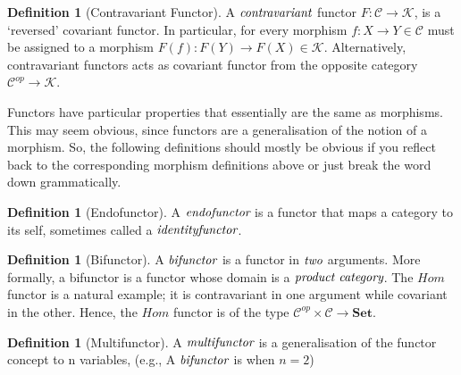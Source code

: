 \documentclass[10pt, oneside, reqno]{amsart}
\theoremstyle{plain}%
\theoremstyle{definition}
\newtheorem{defn}[thm]{Definition}
\theoremstyle{remark}
\begin{document}
\begin{defn}[Contravariant Functor]
 A $\emph{contravariant}$ functor $F: \mathcal{C} \to \mathcal{K}$, is a `reversed' covariant functor.
 In particular, for every morphism $f: X \to Y \in \mathcal{C}$ must be assigned to a morphism $F(f) : F(Y) \to F(X) \in \mathcal{K}$.
 Alternatively, contravariant functors acts as covariant functor from the opposite category $\mathcal{C}^{op} \to \mathcal{K}$.
\end{defn}

Functors have particular properties that essentially are the same as morphisms.
This may seem obvious, since functors are a generalisation of the notion of a morphism.
So, the following definitions should mostly be obvious if you reflect back to the corresponding morphism
definitions above or just break the word down grammatically.

\begin{defn}[Endofunctor]
 A $\emph{endofunctor}$ is a functor that maps a category to its self, sometimes called a $\emph{identityfunctor}$.
\end{defn}

\begin{defn}[Bifunctor]
 A $\emph{bifunctor}$ is a functor in $\emph{two}$ arguments. More formally, a bifunctor is a functor whose
 domain is a $\emph{product category}$.
 The $Hom$ functor is a natural example; it is contravariant in one argument while covariant in the other.
 Hence, the $Hom$ functor is of the type $\mathcal{C}^{op} \times \mathcal{C} \to \textbf{Set}$.
\end{defn}

\begin{defn}[Multifunctor]
 A $\emph{multifunctor}$ is a generalisation of the functor concept to n variables, (e.g., A $\emph{bifunctor}$ is when $n=2$)
\end{defn}
\end{document}
